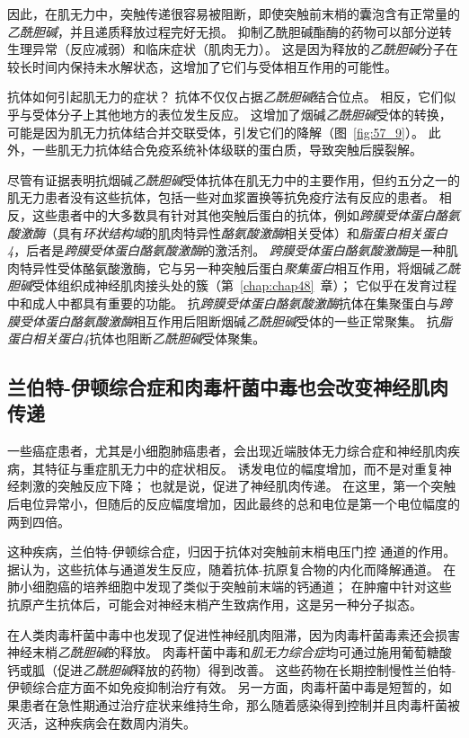 因此，在肌无力中，突触传递很容易被阻断，即使突触前末梢的囊泡含有正常量的\textit{乙酰胆碱}，并且递质释放过程完好无损。
抑制乙酰胆碱酯酶的药物可以部分逆转生理异常（反应减弱）和临床症状（肌肉无力）。
这是因为释放的\textit{乙酰胆碱}分子在较长时间内保持未水解状态，这增加了它们与受体相互作用的可能性。


抗体如何引起肌无力的症状？
抗体不仅仅占据\textit{乙酰胆碱}结合位点。
相反，它们似乎与受体分子上其他地方的表位发生反应。
这增加了烟碱\textit{乙酰胆碱}受体的转换，可能是因为肌无力抗体结合并交联受体，引发它们的降解（图~\ref{fig:57_9}）。
此外，一些肌无力抗体结合免疫系统补体级联的蛋白质，导致突触后膜裂解。


尽管有证据表明抗烟碱\textit{乙酰胆碱}受体抗体在肌无力中的主要作用，但约五分之一的肌无力患者没有这些抗体，包括一些对血浆置换等抗免疫疗法有反应的患者。
相反，这些患者中的大多数具有针对其他突触后蛋白的抗体，例如\textit{跨膜受体蛋白酪氨酸激酶}（具有\textit{环状结构域}的肌肉特异性\textit{酪氨酸激酶}相关受体）和\textit{脂蛋白相关蛋白4}，后者是\textit{跨膜受体蛋白酪氨酸激酶}的激活剂。
\textit{跨膜受体蛋白酪氨酸激酶}是一种肌肉特异性受体酪氨酸激酶，它与另一种突触后蛋白\textit{聚集蛋白}相互作用，将烟碱\textit{乙酰胆碱}受体组织成神经肌肉接头处的簇（第~\ref{chap:chap48}~章）；
它似乎在发育过程中和成人中都具有重要的功能。
抗\textit{跨膜受体蛋白酪氨酸激酶}抗体在集聚蛋白与\textit{跨膜受体蛋白酪氨酸激酶}相互作用后阻断烟碱\textit{乙酰胆碱}受体的一些正常聚集。
抗\textit{脂蛋白相关蛋白4}抗体也阻断\textit{乙酰胆碱}受体聚集。



\subsection{兰伯特-伊顿综合症和肉毒杆菌中毒也会改变神经肌肉传递}

一些癌症患者，尤其是小细胞肺癌患者，会出现近端肢体无力综合症和神经肌肉疾病，其特征与重症肌无力中的症状相反。
诱发电位的幅度增加，而不是对重复神经刺激的突触反应下降；
也就是说，促进了神经肌肉传递。
在这里，第一个突触后电位异常小，但随后的反应幅度增加，因此最终的总和电位是第一个电位幅度的两到四倍。


这种疾病，兰伯特-伊顿综合症，归因于抗体对突触前末梢电压门控  通道的作用。
据认为，这些抗体与通道发生反应，随着抗体-抗原复合物的内化而降解通道。
在肺小细胞癌的培养细胞中发现了类似于突触前末端的钙通道；
在肿瘤中针对这些抗原产生抗体后，可能会对神经末梢产生致病作用，这是另一种分子拟态。


在人类肉毒杆菌中毒中也发现了促进性神经肌肉阻滞，因为肉毒杆菌毒素还会损害神经末梢\textit{乙酰胆碱}的释放。
肉毒杆菌中毒和\textit{肌无力综合症}均可通过施用葡萄糖酸钙或胍（促进\textit{乙酰胆碱}释放的药物）得到改善。
这些药物在长期控制慢性兰伯特-伊顿综合症方面不如免疫抑制治疗有效。
另一方面，肉毒杆菌中毒是短暂的，如果患者在急性期通过治疗症状来维持生命，那么随着感染得到控制并且肉毒杆菌被灭活，这种疾病会在数周内消失。



